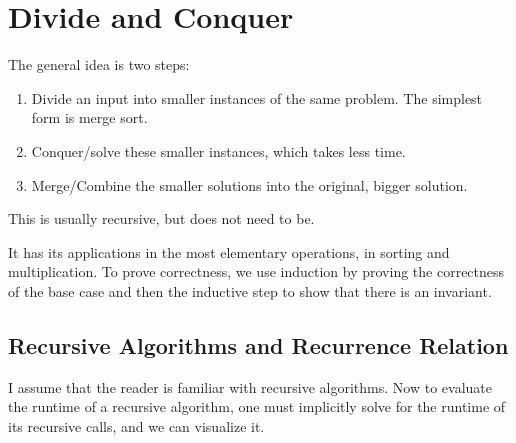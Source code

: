 \documentclass{article}
\begin{document}
    \begin{definition}[QR Decomposition]
      
    \end{definition}

    \begin{definition}[LU Decomposition]
      
    \end{definition}

    \begin{definition}
      
    \end{definition}

\section{Divide and Conquer} 

    \begin{definition}
      The general idea is two steps: 
      \begin{enumerate}
        \item Divide an input into smaller instances of the same problem. The simplest form is merge sort. 
        \item Conquer/solve these smaller instances, which takes less time. 
        \item Merge/Combine the smaller solutions into the original, bigger solution. 
      \end{enumerate}
      This is usually recursive, but does not need to be. 
    \end{definition}

    It has its applications in the most elementary operations, in sorting and multiplication. To prove correctness, we use induction by proving the correctness of the base case and then the inductive step to show that there is an invariant. 
  
  \subsection{Recursive Algorithms and Recurrence Relation}

    I assume that the reader is familiar with recursive algorithms. Now to evaluate the runtime of a recursive algorithm, one must implicitly solve for the runtime of its recursive calls, and we can visualize it. 
\end{document}
